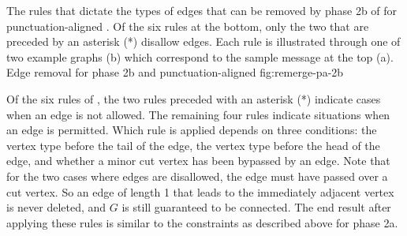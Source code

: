 {The rules that dictate the types of edges that can be removed
by phase 2b of \remerge for punctuation-aligned \repair.  Of the six
rules at the bottom, only the two that are preceded by an asterisk (*)
disallow edges.  Each rule is illustrated through one of two example
graphs (b) which correspond to the sample message at the top (a).}
{Edge removal for phase 2b and punctuation-aligned
\repair}{fig:remerge-pa-2b}

Of the six rules of , the two 
rules preceded with an asterisk (*) indicate cases when an edge is
not allowed.  The remaining four rules indicate situations when
an edge is permitted.  Which rule is applied depends on three
conditions:  the vertex type before the tail of the edge,
the vertex type before the head of the edge, and whether a
minor cut vertex has been bypassed by an edge.  Note that for
the two cases where edges are disallowed, the edge must have
passed over a cut vertex.
So an edge of length 1 that leads to the
immediately adjacent vertex is never deleted, and $G$ is
still guaranteed to be connected.
The end result after applying 
these rules is similar to the constraints as described above
for phase 2a.

